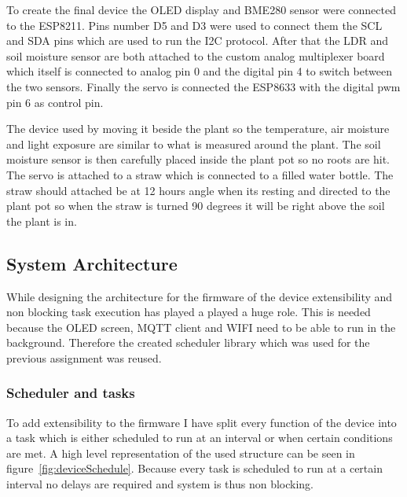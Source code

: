 \documentclass[11pt,a4paper]{article}
\begin{document}
To create the final device the OLED display and BME280 sensor were connected to the ESP8211. Pins number D5 and D3 were used to connect them the SCL and SDA pins which are used to run the I2C protocol.
\newline
After that the LDR and soil moisture sensor are both attached to the custom analog multiplexer board which itself is connected to analog pin 0 and the digital pin 4 to switch between the two sensors.
\newline
Finally the servo is connected the ESP8633 with the digital pwm pin 6 as control pin.\bigskip

The device used by moving it beside the plant so the temperature, air moisture and light exposure are similar to what is measured around the plant. The soil moisture sensor is then carefully placed inside the plant pot so no roots are hit. The servo is attached to a straw which is connected to a filled water bottle. The straw should attached be at 12 hours angle when its resting and directed to the plant pot so when the straw is turned 90 degrees it will be right above the soil the plant is in.

\subsection{System Architecture}
While designing the architecture for the firmware of the device extensibility and non blocking task execution has played a played a huge role. This is needed because the OLED screen, MQTT client and WIFI need to be able to run in the background. Therefore the created scheduler library which was used for the previous assignment was reused.\bigskip

\subsubsection{Scheduler and tasks}
To add extensibility to the firmware I have split every function of the device into a task which is either scheduled to run at an interval or when certain conditions are met. A high level representation of the used structure can be seen in figure~\ref{fig:deviceSchedule}. Because every task is scheduled to run at a certain interval no delays are required and system is thus non blocking.\bigskip
\end{document}
